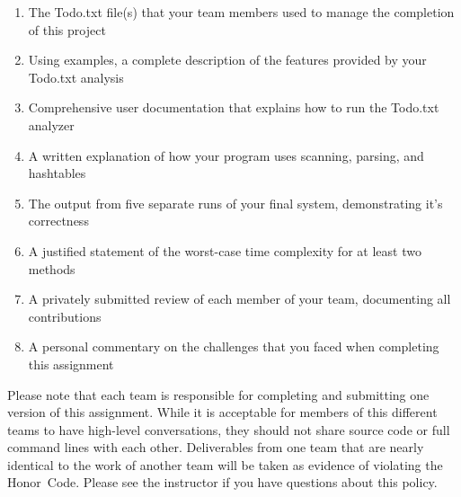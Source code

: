   
  \vspace*{-.05in}
 \begin{enumerate} 
  \itemsep0pt

  \item The Todo.txt file(s) that your team members used to manage the completion of this project

  \item Using examples, a complete description of the features provided by your Todo.txt analysis

  \item Comprehensive user documentation that explains how to run the Todo.txt analyzer

  \item A written explanation of how your program uses scanning, parsing, and hashtables

  \item The output from five separate runs of your final system, demonstrating it's correctness 

  \item A justified statement of the worst-case time complexity for at least two methods 

  \item A privately submitted review of each member of your team, documenting all contributions 

  \item A personal commentary on the challenges that you faced when completing this assignment 
   
  \end{enumerate}
  \vspace*{-.05in}

  Please note that each team is responsible for completing and submitting one version of this assignment.  While it is
  acceptable for members of this different teams to have high-level conversations, they should not share source code or
  full command lines with each other.  Deliverables from one team that are nearly identical to the work of another team
  will be taken as evidence of violating the \mbox{Honor Code}.  Please see the instructor if you have questions about
  this policy.

  
